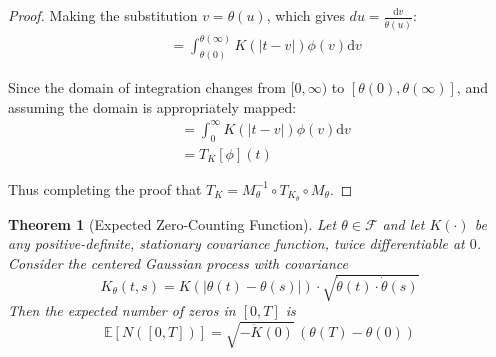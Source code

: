 \documentclass{article}
\newtheorem{theorem}{Theorem}
\newcommand{\dd}{\mathrm{d}}
\newcommand{\EE}{\mathbb{E}}
\newcommand{\Fcal}{\mathcal{F}}
\newcommand{\dottheta}{\dot{\theta}}
\begin{document}
\begin{proof}
Making the substitution $v = \theta(u)$, which gives $du = \frac{\dd v}{\dottheta(u)}$:
\begin{align}
&= \int_{\theta(0)}^{\theta(\infty)} K(|t-v|) \phi(v) \dd v
\end{align}

Since the domain of integration changes from $[0,\infty)$ to $[\theta(0),\theta(\infty)]$, and assuming the domain is appropriately mapped:
\begin{align}
&= \int_0^\infty K(|t-v|) \phi(v) \dd v\\
&= T_K[\phi](t)
\end{align}

Thus completing the proof that $T_K = M_\theta^{-1} \circ T_{K_\theta} \circ M_\theta$.
\end{proof}

\begin{theorem}[Expected Zero-Counting Function]
Let $\theta\in\Fcal$ and let $K(\cdot)$ be any positive-definite, stationary covariance function, twice differentiable at $0$. Consider the centered Gaussian process with covariance
\begin{equation}
K_\theta(t,s) = K(|\theta(t)-\theta(s)|) \cdot \sqrt{\dottheta(t) \cdot \dottheta(s)}
\end{equation}
Then the expected number of zeros in $[0,T]$ is
\begin{equation}
\EE[N([0,T])] = \sqrt{-\ddot{K}(0)} \, (\theta(T)-\theta(0))
\end{equation}
\end{theorem}
\end{document}
